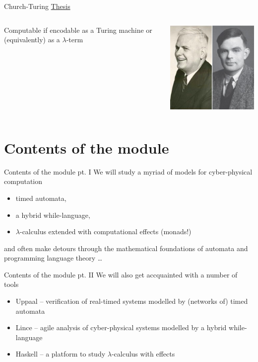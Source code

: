 \documentclass{beamer}
\begin{document}
\begin{frame}{Church-Turing \underline{Thesis}}
        \begin{minipage}[0.3\textheight]{\textwidth}
        \begin{columns}[c]
        \begin{column}{0.6\textwidth}
                \alert{Computable} if encodable as a Turing
                machine or (equivalently) as a $\lambda$-term
        \end{column}
        \begin{column}{0.2\textwidth}
          \includegraphics[scale=0.3]{Images/ChurchTuring.jpg}
        \end{column}
        \end{columns}
        \end{minipage}


\end{frame}
\section{Contents of the module}


\begin{frame}{Contents of the module pt. I}
  We will study a myriad of models for cyber-physical computation
  \begin{itemize}
  \item timed automata,
  \item a hybrid while-language,
  \item $\lambda$-calculus extended with computational effects (\alert{monads!})
  \end{itemize}

  \pause
  and often make detours through the \alert{mathematical
  foundations} of automata and programming language theory \dots
\end{frame}

\begin{frame}{Contents of the module pt. II}
  We will also get accquainted with a number of tools
  \begin{itemize}
  \item \alert{Uppaal} -- verification of real-timed systems modelled by (networks of) timed automata
  \item \alert{Lince} -- agile analysis of cyber-physical systems modelled by a hybrid
    while-language
  \item \alert{Haskell} -- a platform to study $\lambda$-calculus
    with effects
  \end{itemize}
\end{frame}
\end{document}
